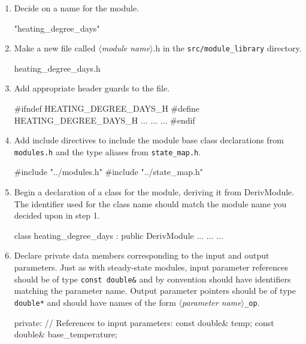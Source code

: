 \documentclass{article}\usepackage[]{graphicx}\usepackage[]{color}
\newcommand{\code}[1]{\lstinline[style=C++style]{#1}}
\newcommand{\placeholder}[1]{$\langle$\textrm{\textit{#1}}$\rangle$}
\begin{document}
\begin{enumerate}

\item Decide on a name for the module.

  \begin{example}[4]
    "heating_degree_days"
  \end{example}

\item Make a new file called \placeholder{module name}.h in the
  \code{src/module_library} directory.

  \begin{example}[4]
    heating_degree_days.h
  \end{example}

\item Add appropriate header guards to the file.
  \begin{example}[4]
    #ifndef HEATING_DEGREE_DAYS_H
    #define HEATING_DEGREE_DAYS_H
    ...
    ...
    ...
    #endif
  \end{example}

\item Add include directives to include the module base class
  declarations from \code{modules.h} and the type aliases from
  \code{state_map.h}.
  \begin{example}[4]
    #include "../modules.h"
    #include "../state_map.h"
  \end{example}

\item Begin a declaration of a class for the module, deriving it from
  DerivModule.  The identifier used for the class name should match
  the module name you decided upon in step 1.
  \begin{example}[4]
    class heating_degree_days : public DerivModule {
      ...
      ...
      ...
    }
  \end{example}

\item Declare private data members corresponding to the input and
  output parameters.  Just as with steady-state modules, input
  parameter references should be of type \code{const double&} and by
  convention should have identifiers matching the parameter name.
  Output parameter pointers should be of type \code{double*} and
  should have names of the form \placeholder{parameter
  name}\code{_op}.
  \begin{example}[4]
    private:
       // References to input parameters:
       const double& temp;
       const double& base_temperature;


\end{example}
\end{enumerate}
\end{document}
